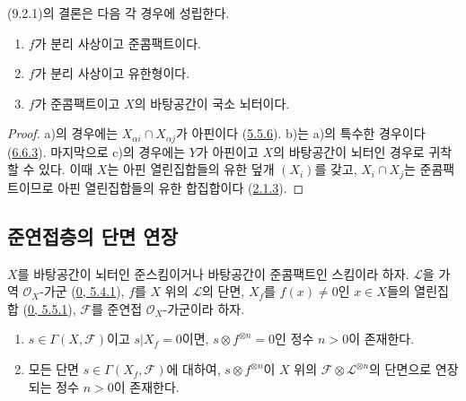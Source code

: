 \begin{corollary}[9.2.2]
\label{I.9.2.2-ko}
(9.2.1)의 결론은 다음 각 경우에 성립한다.
\begin{enumerate}
\item[a)] $f$가 분리 사상이고 준콤팩트이다.
\item[b)] $f$가 분리 사상이고 유한형이다.
\item[c)] $f$가 준콤팩트이고 $X$의 바탕공간이 국소 뇌터이다.
\end{enumerate}
\end{corollary}

\begin{proof}
a)의 경우에는 $X_{\alpha i}\cap X_{\alpha j}$가 아핀이다
(\hyperref[I.5.5.6-ko]{5.5.6}). b)는 a)의 특수한 경우이다
(\hyperref[I.6.6.3-ko]{6.6.3}). 마지막으로 c)의 경우에는 $Y$가
아핀이고 $X$의 바탕공간이 뇌터인 경우로 귀착할 수 있다. 이때 $X$는
아핀 열린집합들의 유한 덮개 $(X_i)$를 갖고, $X_i\cap X_j$는
준콤팩트이므로 아핀 열린집합들의 유한 합집합이다
(\hyperref[I.2.1.3-ko]{2.1.3}).
\end{proof}

\subsection{준연접층의 단면 연장}
\label{subsection:I.9.3-ko}

\begin{theorem}[9.3.1]
\label{I.9.3.1-ko}
$X$를 바탕공간이 뇌터인 준스킴이거나 바탕공간이 준콤팩트인 스킴이라
하자. $\mathscr{L}$을 가역 $\mathscr{O}_X$-가군
(\hyperref[0.5.4.1-ko]{0, 5.4.1}), $f$를 $X$ 위의 $\mathscr{L}$의
단면, $X_f$를 $f(x)\neq0$인 $x\in X$들의 열린집합
(\hyperref[0.5.5.1-ko]{0, 5.5.1}), $\mathscr{F}$를 준연접
$\mathscr{O}_X$-가군이라 하자.
\begin{enumerate}
\item[(i)] $s\in\Gamma(X,\mathscr{F})$이고 $s|X_f=0$이면,
  $s\otimes f^{\otimes n}=0$인 정수 $n>0$이 존재한다.
\item[(ii)] 모든 단면 $s\in\Gamma(X_f,\mathscr{F})$에 대하여,
  $s\otimes f^{\otimes n}$이 $X$ 위의
  $\mathscr{F}\otimes\mathscr{L}^{\otimes n}$의 단면으로 연장되는 정수
  $n>0$이 존재한다.
\end{enumerate}
\end{theorem}

